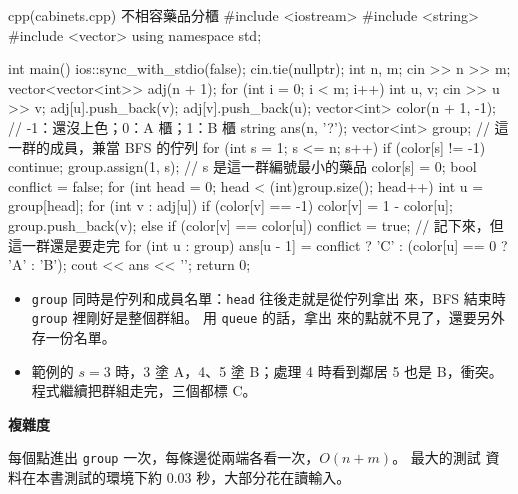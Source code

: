 \begin{example}[label=ex:cabinets]{cpp}{(cabinets.cpp) 不相容藥品分櫃}
#include <iostream>
#include <string>
#include <vector>
using namespace std;

int main() {
    ios::sync_with_stdio(false);
    cin.tie(nullptr);
    int n, m;
    cin >> n >> m;
    vector<vector<int>> adj(n + 1);
    for (int i = 0; i < m; i++) {
        int u, v;
        cin >> u >> v;
        adj[u].push_back(v);
        adj[v].push_back(u);
    }
    vector<int> color(n + 1, -1);          // -1：還沒上色；0：A 櫃；1：B 櫃
    string ans(n, '?');
    vector<int> group;                     // 這一群的成員，兼當 BFS 的佇列
    for (int s = 1; s <= n; s++) {
        if (color[s] != -1) {
            continue;
        }
        group.assign(1, s);                // s 是這一群編號最小的藥品
        color[s] = 0;
        bool conflict = false;
        for (int head = 0; head < (int)group.size(); head++) {
            int u = group[head];
            for (int v : adj[u]) {
                if (color[v] == -1) {
                    color[v] = 1 - color[u];
                    group.push_back(v);
                } else if (color[v] == color[u]) {
                    conflict = true;       // 記下來，但這一群還是要走完
                }
            }
        }
        for (int u : group) {
            ans[u - 1] = conflict ? 'C' : (color[u] == 0 ? 'A' : 'B');
        }
    }
    cout << ans << '\n';
    return 0;
}
\end{example}


\begin{itemize}
\item \texttt{group} 同時是佇列和成員名單：\texttt{head} 往後走就是從佇列拿出
來，BFS 結束時 \texttt{group} 裡剛好是整個群組。 用 \texttt{queue} 的話，拿出
來的點就不見了，還要另外存一份名單。
\item 範例的 $s = 3$ 時，3 塗 A，4、5 塗 B；處理 4 時看到鄰居 5 也是 B，衝突。
程式繼續把群組走完，三個都標 C。
\end{itemize}

\textbf{複雜度}

每個點進出 \texttt{group} 一次，每條邊從兩端各看一次，$O(n + m)$。 最大的測試
資料在本書測試的環境下約 $0.03$ 秒，大部分花在讀輸入。

